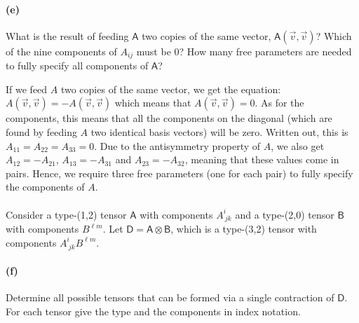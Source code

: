 \documentclass{article}
\begin{document}
\paragraph{(e)}	
What is the result of feeding $\mathsf{A}$ two copies of the same vector, $\mathsf{A}(\vec{v},\vec{v})$?  Which of the nine components of $A_{ij}$ must be 0?  How many free
parameters are needed to fully specify all components of $\mathsf{A}$?

\begin{solution}
	If we feed $A$ two copies of the same vector, we get the equation: $A(\vec v, \vec v) = - A(\vec v, \vec v)$
	which means that $A(\vec v, \vec v) = 0$. As for the components, this means that all the components 
	on the diagonal (which are found by feeding $A$ two identical basis vectors) will be zero. Written out, 
	this is $A_{11} = A_{22} = A_{33} = 0$. Due to the antisymmetry property of $A$, we also get
	$A_{12} = -A_{21}$, $A_{13} = - A_{31}$ and $A_{23} = -A_{32}$, meaning that these values come in pairs. 
	Hence, we require three free parameters (one for each pair) to fully specify the components of $A$. 
\end{solution}

\phline
\paragraph{}
Consider a type-(1,2) tensor $\mathsf{A}$ with components $A^{i}_{\ jk}$ and a type-(2,0) tensor $\mathsf{B}$ with components $B^{\ell m}$.  
Let $\mathsf{D} = \mathsf{A}\otimes\mathsf{B}$, which is a type-(3,2) tensor with components $A^{i}_{\ jk}B^{\ell m}$.

\paragraph{(f)}	
Determine all possible tensors that can be formed via a single contraction of $\mathsf{D}$.  For each tensor give the type and the components in index notation.\\
\end{document}
